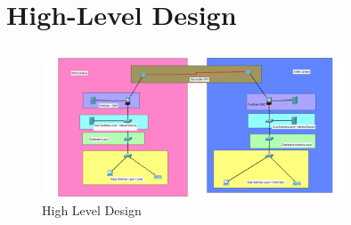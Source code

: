 \documentclass[12pt]{report}
\begin{document}
\section{High-Level Design}
\begin{figure}[h]
    \centering
    \includegraphics[width=0.8\textwidth]{images/HLfig.png}
    \caption{High Level Design}
    \label{fig:High Level Design}
\end{figure}
\end{document}
